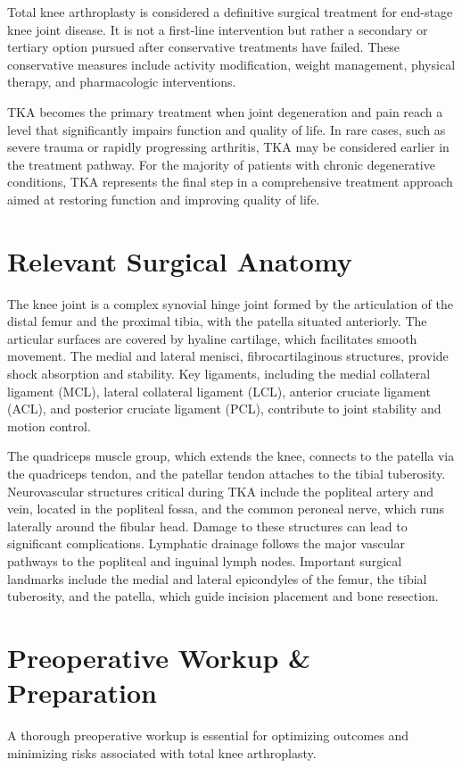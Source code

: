 Total knee arthroplasty is considered a definitive surgical treatment for end-stage knee joint disease. It is not a first-line intervention but rather a secondary or tertiary option pursued after conservative treatments have failed. These conservative measures include activity modification, weight management, physical therapy, and pharmacologic interventions.

TKA becomes the primary treatment when joint degeneration and pain reach a level that significantly impairs function and quality of life. In rare cases, such as severe trauma or rapidly progressing arthritis, TKA may be considered earlier in the treatment pathway. For the majority of patients with chronic degenerative conditions, TKA represents the final step in a comprehensive treatment approach aimed at restoring function and improving quality of life.

\section*{Relevant Surgical Anatomy}
The knee joint is a complex synovial hinge joint formed by the articulation of the distal femur and the proximal tibia, with the patella situated anteriorly. The articular surfaces are covered by hyaline cartilage, which facilitates smooth movement. The medial and lateral menisci, fibrocartilaginous structures, provide shock absorption and stability. Key ligaments, including the medial collateral ligament (MCL), lateral collateral ligament (LCL), anterior cruciate ligament (ACL), and posterior cruciate ligament (PCL), contribute to joint stability and motion control.

The quadriceps muscle group, which extends the knee, connects to the patella via the quadriceps tendon, and the patellar tendon attaches to the tibial tuberosity. Neurovascular structures critical during TKA include the popliteal artery and vein, located in the popliteal fossa, and the common peroneal nerve, which runs laterally around the fibular head. Damage to these structures can lead to significant complications. Lymphatic drainage follows the major vascular pathways to the popliteal and inguinal lymph nodes. Important surgical landmarks include the medial and lateral epicondyles of the femur, the tibial tuberosity, and the patella, which guide incision placement and bone resection.

\section*{Preoperative Workup \& Preparation}
A thorough preoperative workup is essential for optimizing outcomes and minimizing risks associated with total knee arthroplasty.

